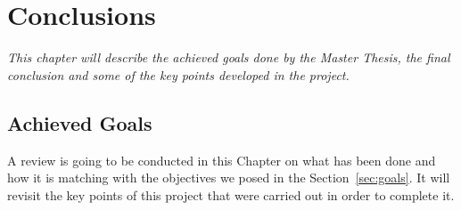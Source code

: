 \chapter{Conclusions}
\label{chap:conclusions}
\textit{This chapter will describe the achieved goals done by the Master Thesis, the final conclusion and some of the key points developed in the project.}

\clearpage
\section{Achieved Goals}
A review is going to be conducted in this Chapter on what has been done and how it is matching with the objectives we posed in the Section~\ref{sec:goals}. It will revisit the key points of this project that were carried out in order to complete it.

